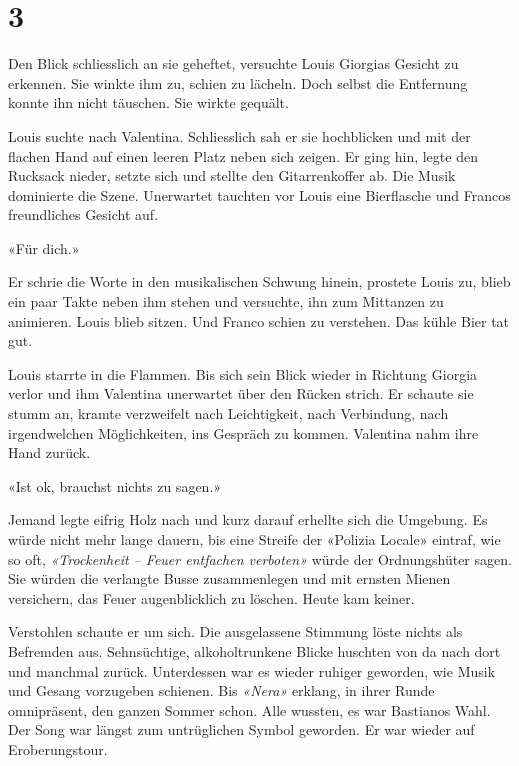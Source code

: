 \chapter{3}


Den Blick schliesslich an sie geheftet, versuchte Louis Giorgias Gesicht zu erkennen. Sie winkte ihm zu, schien zu lächeln. Doch selbst die Entfernung konnte ihn nicht täuschen. Sie wirkte gequält. 

Louis suchte nach Valentina. Schliesslich sah er sie hochblicken und mit der flachen Hand auf einen leeren Platz neben sich zeigen. Er ging hin, legte den Rucksack nieder, setzte sich und stellte den Gitarrenkoffer ab. Die Musik dominierte die Szene. Unerwartet tauchten vor Louis eine Bierflasche und Francos freundliches Gesicht auf.

«Für dich.»

Er schrie die Worte in den musikalischen Schwung hinein, prostete Louis zu, blieb ein paar Takte neben ihm stehen und versuchte, ihn zum Mittanzen zu animieren. Louis blieb sitzen. Und Franco schien zu verstehen. Das kühle Bier tat gut.

Louis starrte in die Flammen. Bis sich sein Blick wieder in Richtung Giorgia verlor und ihm Valentina unerwartet über den Rücken strich. Er schaute sie stumm an, kramte verzweifelt nach Leichtigkeit, nach Verbindung, nach irgendwelchen Möglichkeiten, ins Gespräch zu kommen. Valentina nahm ihre Hand zurück.

«Ist ok, brauchst nichts zu sagen.»

Jemand legte eifrig Holz nach und kurz darauf erhellte sich die Umgebung. Es würde nicht mehr lange dauern, bis eine Streife der «Polizia Locale» eintraf, wie so oft, \emph{«Trockenheit -- Feuer entfachen verboten»} würde der Ordnungshüter sagen. Sie würden die verlangte Busse zusammenlegen und mit ernsten Mienen versichern, das Feuer augenblicklich zu löschen. Heute kam keiner. 

Verstohlen schaute er um sich. Die ausgelassene Stimmung löste nichts als Befremden aus. Sehnsüchtige, alkoholtrunkene Blicke huschten von da nach dort und manchmal zurück. Unterdessen war es wieder ruhiger geworden, wie Musik und Gesang vorzugeben schienen. Bis \emph{«Nera»} erklang, in ihrer Runde omnipräsent, den ganzen Sommer schon. Alle wussten, es war Bastianos Wahl. Der Song war längst zum untrüglichen Symbol geworden. Er war wieder auf Eroberungstour.


